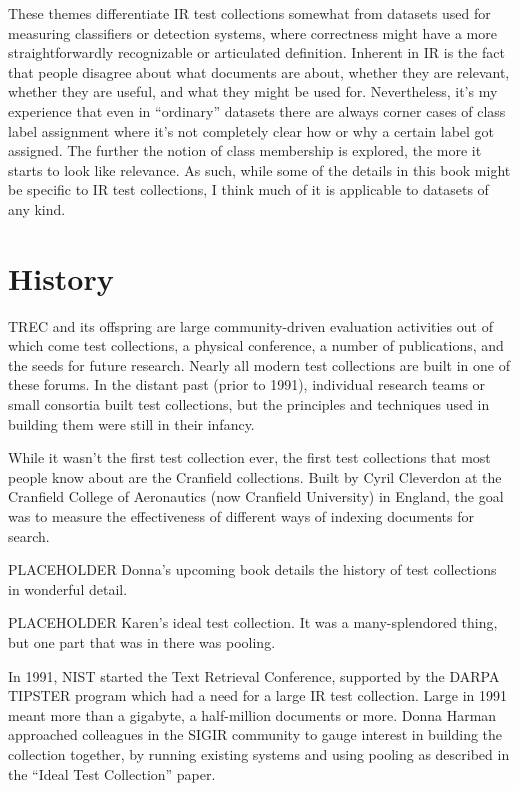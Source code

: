 \documentclass[nobib]{tufte-book}
\begin{document}
These themes differentiate IR test collections somewhat from datasets used for measuring classifiers or detection systems, where correctness might have a more straightforwardly recognizable or articulated definition.  Inherent in IR is the fact that people disagree about what documents are about, whether they are relevant, whether they are useful, and what they might be used for.  Nevertheless, it's my experience that even in ``ordinary'' datasets there are always corner cases of class label assignment where it's not completely clear how or why a certain label got assigned.  The further the notion of class membership is explored, the more it starts to look like relevance.  As such, while some of the details in this book might be specific to IR test collections, I think much of it is applicable to datasets of any kind.

\section{History}

TREC and its offspring are large community-driven evaluation activities out of which come test collections, a physical conference, a number of publications, and the seeds for future research.  Nearly all modern test collections are built in one of these forums.  In the distant past (prior to 1991), individual research teams or small consortia built test collections, but the principles and techniques used in building them were still in their infancy.

While it wasn't the first test collection ever, the first test collections that most people know about are the Cranfield collections.  Built by Cyril Cleverdon at the Cranfield College of Aeronautics (now Cranfield University) in England, the goal was to measure the effectiveness of different ways of indexing documents for search.

PLACEHOLDER Donna's upcoming book details the history of test collections in wonderful detail.

PLACEHOLDER Karen's ideal test collection.  It was a many-splendored thing, but one part that was in there was pooling.

In 1991, NIST started the Text Retrieval Conference, supported by the DARPA TIPSTER program which had a need for a large IR test collection.\autocite{harman_darpa_1992}  Large in 1991 meant more than a gigabyte, a half-million documents or more.  Donna Harman approached colleagues in the SIGIR community to gauge interest in building the collection together, by running existing systems and using pooling as described in the ``Ideal Test Collection'' paper.
\end{document}
